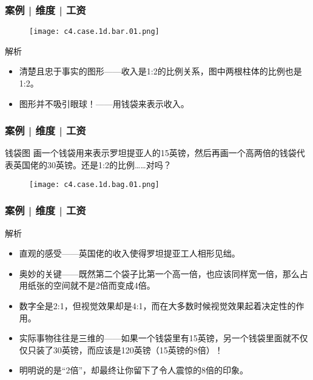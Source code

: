 \begin{frame}
  \frametitle{案例 | 维度 | 工资}
  \begin{figure}
    \centering
    \texttt{[image: c4.case.1d.bar.01.png]}
  \end{figure}
  \vspace{-1em}
  \begin{block}{解析}
    \begin{itemize}
      \item 清楚且忠于事实的图形——收入是1:2的比例关系，图中两根柱体的比例也是1:2。
      \item 图形并不吸引眼球！——用钱袋来表示收入。
    \end{itemize}
  \end{block}
\end{frame}

\begin{frame}
  \frametitle{案例 | 维度 | 工资}
  \begin{block}{钱袋图}
    画一个钱袋用来表示罗坦提亚人的15英镑，然后再画一个高两倍的钱袋代表英国佬的30英镑。还是1:2的比例……对吗？
  \end{block}
  \vspace{-0.5em}
  \begin{figure}
    \centering
    \texttt{[image: c4.case.1d.bag.01.png]}
  \end{figure}
\end{frame}

\begin{frame}
  \frametitle{案例 | 维度 | 工资}
  \begin{block}{解析}
    \begin{itemize}
      \item 直观的感受——英国佬的收入使得罗坦提亚工人相形见绌。
      \item 奥妙的关键——既然第二个袋子比第一个高一倍，也应该同样宽一倍，那么占用纸张的空间就不是2倍而变成4倍。
      \item 数字全是2:1，但视觉效果却是4:1，而在大多数时候视觉效果起着决定性的作用。
      \item 实际事物往往是三维的——如果一个钱袋里有15英镑，另一个钱袋里面就不仅仅只装了30英镑，而应该是120英镑（15英镑的8倍）！
      \item 明明说的是“2倍”，却最终让你留下了令人震惊的8倍的印象。
    \end{itemize}
  \end{block}
\end{frame}

